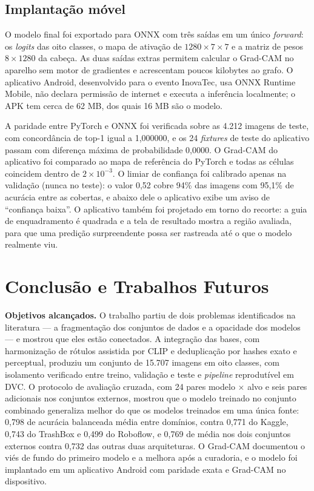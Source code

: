 \documentclass[11pt,a4paper]{article}
\begin{document}
	\subsection{Implantação móvel}
	\label{sec:implantacao}
	
	O modelo final foi exportado para ONNX com três saídas em um único \emph{forward}: os \emph{logits} das oito classes, o mapa de ativação de $1280 \times 7 \times 7$ e a matriz de pesos $8 \times 1280$ da cabeça. As duas saídas extras permitem calcular o Grad-CAM no aparelho sem motor de gradientes e acrescentam poucos kilobytes ao grafo. O aplicativo Android, desenvolvido para o evento InovaTec, usa ONNX Runtime Mobile, não declara permissão de internet e executa a inferência localmente; o APK tem cerca de 62 MB, dos quais 16 MB são o modelo.
	
	A paridade entre PyTorch e ONNX foi verificada sobre as 4.212 imagens de teste, com concordância de top-1 igual a 1,000000, e os 24 \emph{fixtures} de teste do aplicativo passam com diferença máxima de probabilidade 0,0000. O Grad-CAM do aplicativo foi comparado ao mapa de referência do PyTorch e todas as células coincidem dentro de $2 \times 10^{-3}$. O limiar de confiança foi calibrado apenas na validação (nunca no teste): o valor 0,52 cobre 94\% das imagens com 95,1\% de acurácia entre as cobertas, e abaixo dele o aplicativo exibe um aviso de ``confiança baixa''. O aplicativo também foi projetado em torno do recorte: a guia de enquadramento é quadrada e a tela de resultado mostra a região avaliada, para que uma predição surpreendente possa ser rastreada até o que o modelo realmente viu.
	
	\section{Conclusão e Trabalhos Futuros}
	\label{sec:conclusao}
	
	\textbf{Objetivos alcançados.} O trabalho partiu de dois problemas identificados na literatura --- a fragmentação dos conjuntos de dados e a opacidade dos modelos --- e mostrou que eles estão conectados. A integração das bases, com harmonização de rótulos assistida por CLIP e deduplicação por hashes exato e perceptual, produziu um conjunto de 15.707 imagens em oito classes, com isolamento verificado entre treino, validação e teste e \emph{pipeline} reprodutível em DVC. O protocolo de avaliação cruzada, com 24 pares modelo $\times$ alvo e seis pares adicionais nos conjuntos externos, mostrou que o modelo treinado no conjunto combinado generaliza melhor do que os modelos treinados em uma única fonte: 0,798 de acurácia balanceada média entre domínios, contra 0,771 do Kaggle, 0,743 do TrashBox e 0,499 do Roboflow, e 0,769 de média nos dois conjuntos externos contra 0,732 das outras duas arquiteturas. O Grad-CAM documentou o viés de fundo do primeiro modelo e a melhora após a curadoria, e o modelo foi implantado em um aplicativo Android com paridade exata e Grad-CAM no dispositivo.
	
\end{document}
